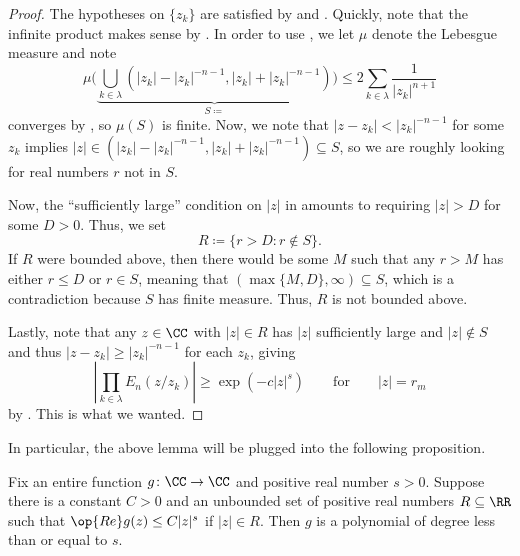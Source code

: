 \documentclass[notes.tex]{subfiles}
\begin{document}
\begin{proof}
	The hypotheses on $\{z_k\}$ are satisfied by  and . Quickly, note that the infinite product makes sense by . In order to use , we let $\mu$ denote the Lebesgue measure and note
	\[\mu\Bigg(\underbrace{\bigcup_{k\in\lambda}\left(|z_k|-|z_k|^{-n-1},|z_k|+|z_k|^{-n-1}\right)}_{S\coloneqq}\Bigg)\le2\sum_{k\in\lambda}\frac1{|z_k|^{n+1}}\]
	converges by , so $\mu(S)$ is finite. Now, we note that $|z-z_k|<|z_k|^{-n-1}$ for some $z_k$ implies $|z|\in\left(|z_k|-|z_k|^{-n-1},|z_k|+|z_k|^{-n-1}\right)\subseteq S$, so we are roughly looking for real numbers $r$ not in $S$.

	Now, the ``sufficiently large'' condition on $|z|$ in  amounts to requiring $|z|>D$ for some $D>0$. Thus, we set
	\[R\coloneqq\{r>D:r\notin S\}.\]
	If $R$ were bounded above, then there would be some $M$ such that any $r>M$ has either $r\le D$ or $r\in S$, meaning that $(\max\{M,D\},\infty)\subseteq S$, which is a contradiction because $S$ has finite measure. Thus, $R$ is not bounded above.

	Lastly, note that any $z\in\CC$ with $|z|\in R$ has $|z|$ sufficiently large and $|z|\notin S$ and thus $|z-z_k|\ge|z_k|^{-n-1}$ for each $z_k$, giving
	\[\left|\prod_{k\in\lambda} E_n(z/z_k)\right|\ge\exp\left(-c|z|^s\right)\qquad\text{for}\qquad|z|=r_m\]
	by . This is what we wanted.
\end{proof}
In particular, the above lemma will be plugged into the following proposition.
\begin{proposition} \label{prop:bounded-re-is-poly}
	Fix an entire function $g\colon\CC\to\CC$ and positive real number $s>0$. Suppose there is a constant $C>0$ and an unbounded set of positive real numbers $R\subseteq\RR$ such that $\op{Re}g(z)\le C|z|^s$ if $|z|\in R$. Then $g$ is a polynomial of degree less than or equal to $s$.
\end{proposition}
\end{document}
